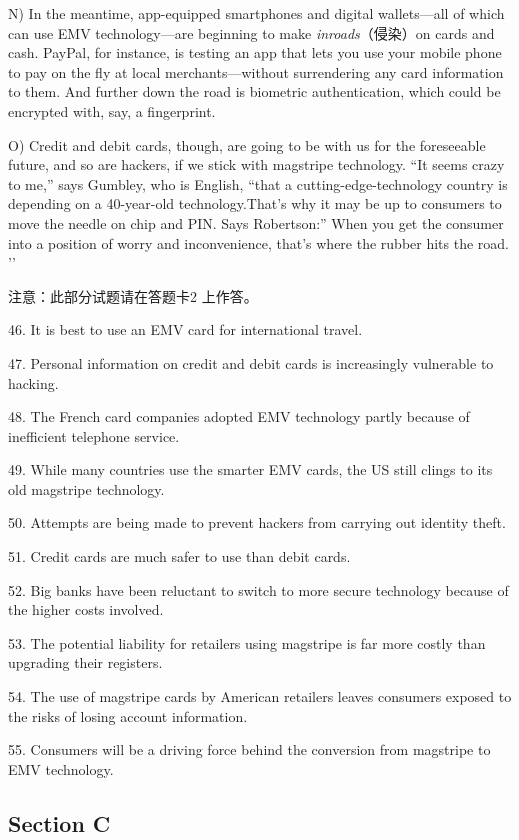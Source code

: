 \documentclass[UTF8,11pt]{ctexart}
\begin{document}
N) In the meantime, app-equipped smartphones and digital wallets—all of which can use EMV technology—are beginning to make\textit{ inroads}（侵染）on cards and cash. PayPal, for instance, is testing an app that lets you use your mobile phone to pay on the fly at local merchants—without surrendering any card information to them. And further down the road is biometric authentication, which could be encrypted with, say, a fingerprint.


O) Credit and debit cards, though, are going to be with us for the foreseeable future, and so are hackers, if we stick with magstripe technology. “It seems crazy to me,” says Gumbley, who is English, “that a cutting-edge-technology country is depending on a 40-year-old technology.That’s why it may be up to consumers to move the needle on chip and PIN. Says Robertson:” When you get the consumer into a position of worry and inconvenience, that’s where the rubber hits the road. ’’


注意：此部分试题请在答题卡2 上作答。


46. It is best to use an EMV card for international travel.


47. Personal information on credit and debit cards is increasingly vulnerable to hacking.


48. The French card companies adopted EMV technology partly because of inefficient telephone service.


49. While many countries use the smarter EMV cards, the US still clings to its old magstripe technology.


50. Attempts are being made to prevent hackers from carrying out identity theft.


51. Credit cards are much safer to use than debit cards.


52. Big banks have been reluctant to switch to more secure technology because of the higher costs involved.


53. The potential liability for retailers using magstripe is far more costly than upgrading their registers.


54. The use of magstripe cards by American retailers leaves consumers exposed to the risks of losing account information.


55. Consumers will be a driving force behind the conversion from magstripe to EMV technology.


\subsection*{\textbf{Section C}}
\end{document}
